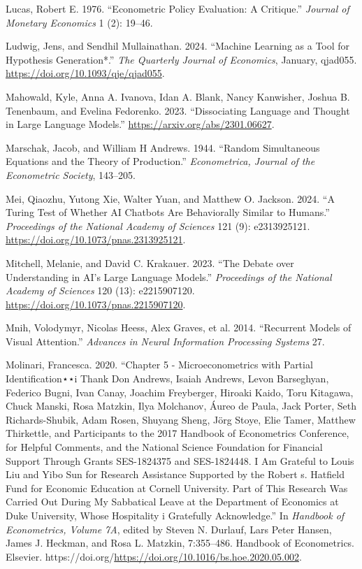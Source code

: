\documentclass[
]{article}
\newlength{\cslhangindent}
\newenvironment{CSLReferences}[2] %
 {\begin{list}{}{%
  \setlength{\itemindent}{0pt}
  \setlength{\leftmargin}{0pt}
  \setlength{\parsep}{0pt}
  \ifodd #1
   \setlength{\leftmargin}{\cslhangindent}
   \setlength{\itemindent}{-1\cslhangindent}
  \fi
  \setlength{\itemsep}{#2\baselineskip}}}
 {\end{list}}
\theoremstyle{plain}
\theoremstyle{definition}
\theoremstyle{remark}
\begin{document}
\begin{CSLReferences}{1}{0}
Lucas, Robert E. 1976. {``Econometric Policy Evaluation: A Critique.''}
\emph{Journal of Monetary Economics} 1 (2): 19--46.

Ludwig, Jens, and Sendhil Mullainathan. 2024. {``{Machine Learning as a
Tool for Hypothesis Generation*}.''} \emph{The Quarterly Journal of
Economics}, January, qjad055. \url{https://doi.org/10.1093/qje/qjad055}.

Mahowald, Kyle, Anna A. Ivanova, Idan A. Blank, Nancy Kanwisher, Joshua
B. Tenenbaum, and Evelina Fedorenko. 2023. {``Dissociating Language and
Thought in Large Language Models.''}
\url{https://arxiv.org/abs/2301.06627}.

Marschak, Jacob, and William H Andrews. 1944. {``Random Simultaneous
Equations and the Theory of Production.''} \emph{Econometrica, Journal
of the Econometric Society}, 143--205.

Mei, Qiaozhu, Yutong Xie, Walter Yuan, and Matthew O. Jackson. 2024.
{``A Turing Test of Whether AI Chatbots Are Behaviorally Similar to
Humans.''} \emph{Proceedings of the National Academy of Sciences} 121
(9): e2313925121. \url{https://doi.org/10.1073/pnas.2313925121}.

Mitchell, Melanie, and David C. Krakauer. 2023. {``The Debate over
Understanding in AI's Large Language Models.''} \emph{Proceedings of the
National Academy of Sciences} 120 (13): e2215907120.
\url{https://doi.org/10.1073/pnas.2215907120}.

Mnih, Volodymyr, Nicolas Heess, Alex Graves, et al. 2014. {``Recurrent
Models of Visual Attention.''} \emph{Advances in Neural Information
Processing Systems} 27.

Molinari, Francesca. 2020. {``Chapter 5 - Microeconometrics with Partial
Identification⋆⋆i Thank Don Andrews, Isaiah Andrews, Levon Barseghyan,
Federico Bugni, Ivan Canay, Joachim Freyberger, Hiroaki Kaido, Toru
Kitagawa, Chuck Manski, Rosa Matzkin, Ilya Molchanov, Áureo de Paula,
Jack Porter, Seth Richards-Shubik, Adam Rosen, Shuyang Sheng, Jörg
Stoye, Elie Tamer, Matthew Thirkettle, and Participants to the 2017
Handbook of Econometrics Conference, for Helpful Comments, and the
National Science Foundation for Financial Support Through Grants
SES-1824375 and SES-1824448. I Am Grateful to Louis Liu and Yibo Sun for
Research Assistance Supported by the Robert s. Hatfield Fund for
Economic Education at Cornell University. Part of This Research Was
Carried Out During My Sabbatical Leave at the Department of Economics at
Duke University, Whose Hospitality i Gratefully Acknowledge.''} In
\emph{Handbook of Econometrics, Volume 7A}, edited by Steven N. Durlauf,
Lars Peter Hansen, James J. Heckman, and Rosa L. Matzkin, 7:355--486.
Handbook of Econometrics. Elsevier.
https://doi.org/\url{https://doi.org/10.1016/bs.hoe.2020.05.002}.


\end{CSLReferences}
\end{document}
